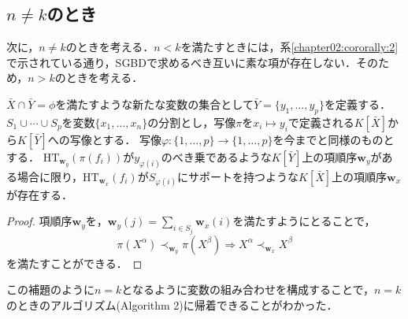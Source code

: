 \subsection{$n \ne k$のとき}
次に，$n \ne k$のときを考える．$n < k$を満たすときには，系\ref{chapter02:cororally:2}で示されている通り，SGBDで求めるべき互いに素な項が存在しない．そのため，$n > k$のときを考える．
\begin{lemma}
	$\bar{X} \cap \bar{Y} = \phi$を満たすような新たな変数の集合として$\bar{Y} = \{y_1, \dots, y_p\}$を定義する．
	$S_1 \cup \cdots \cup S_p$を変数$\{ x_1, \dots, x_n \}$の分割とし，写像$\pi$を$x_i \mapsto y_i$で定義される$K[\bar{X}]$から$K[\bar{Y}]$への写像とする．
写像$\varphi:\{1, \dots, p\} \to \{1, \dots, p\}$を今までと同様のものとする．
$\mathrm{HT}_{\bm{w}_y}(\pi(f_i))$が$y_{\varphi(i)}$のべき乗であるような$K[\bar{Y}]$上の項順序$\bm{w}_y$がある場合に限り，$\mathrm{HT}_{\bm{w}_x}(f_i)$が$S_{\varphi(i)}$にサポートを持つような$K[\bar{X}]$上の項順序$\bm{w}_x$が存在する．
\end{lemma}
\begin{proof}
	項順序$\bm{w}_y$を，$\displaystyle \bm{w}_y(j) = \sum_{i \in S_j}\bm{w}_x(i)$を満たすようにとることで，
	$$\pi(X^\alpha) \prec_{\bm{w}_y} \pi(X^\beta) \Longrightarrow X^\alpha \prec_{\bm{w}_x} X^\beta$$
	を満たすことができる．
\end{proof}
この補題のように$n = k$となるように変数の組み合わせを構成することで，$n = k$のときのアルゴリズム(Algorithm 2)に帰着できることがわかった．



















